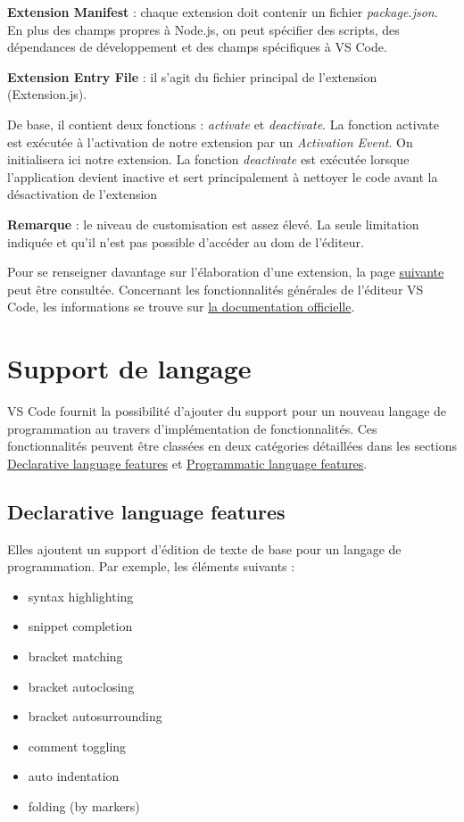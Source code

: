 \documentclass[
    iict, %
    il, %
]{heig-tb}
\begin{document}
\textbf{Extension Manifest} :
chaque extension doit contenir un fichier \emph{package.json}. En plus des champs propres à Node.js, on peut spécifier des scripts, des dépendances de développement et des champs spécifiques à VS Code.

\textbf{Extension Entry File} :
il s'agit du fichier principal de l'extension (Extension.js).

De base, il contient deux fonctions : \emph{activate} et \emph{deactivate}.
La fonction activate est exécutée à l'activation de notre extension par un \emph{Activation Event}. On initialisera ici notre extension.
La fonction \emph{deactivate} est exécutée lorsque l'application devient inactive et sert principalement à nettoyer le code avant la désactivation de l'extension

\textbf{Remarque} : le niveau de customisation est assez élevé. La seule limitation indiquée et qu'il n'est pas possible d'accéder au \Gls{dom} de l'éditeur.

Pour se renseigner davantage sur l'élaboration d'une extension, la page \href{https://code.visualstudio.com/api}{suivante} peut être consultée.
Concernant les fonctionnalités générales de l'éditeur VS Code, les informations se trouve sur \href{https://code.visualstudio.com/docs}{la documentation officielle}.

\section{Support de langage}
VS Code fournit la possibilité d'ajouter du support pour un nouveau langage de programmation au travers d'implémentation de fonctionnalités. Ces fonctionnalités peuvent être classées en deux catégories détaillées
dans les sections \hyperref[Declarative language features]{Declarative language features} et \hyperref[Programmatic language features]{Programmatic language features}.

\subsection{Declarative language features}\label{Declarative language features}
Elles ajoutent un support d'édition de texte de base pour un langage de programmation.
Par exemple, les éléments suivants :

\begin{itemize}
    \item syntax highlighting
    \item snippet completion
    \item bracket matching
    \item bracket autoclosing
    \item bracket autosurrounding
    \item comment toggling
    \item auto indentation
    \item folding (by markers)
\end{itemize}
\end{document}
